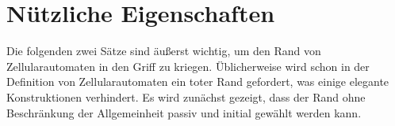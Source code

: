 \begin{comment}
    \begin{proposition}
        Sei $C$ ein $F$-haltender links-erkennender Zellularautomat und $n_0 \in \N$ so, dass $\cworsttime_C(n_0) < n_0$.
        Dann $\forall n \geq n_0: \cworsttime_C(n) = \cworsttime_C(n_0)$.
    \end{proposition}
    \begin{proof}
        Bei der Eingabe eines Wortes $w$ der Länge $n_0$ merkt $C$ nicht mehr, wenn $w$ verlängert wird.
        Ausführlicherer Beweis folgt.
    \end{proof}
\end{comment}

\section{Nützliche Eigenschaften}

Die folgenden zwei Sätze sind äußerst wichtig, um den Rand von Zellularautomaten in den Griff zu kriegen.
Üblicherweise wird schon in der Definition von Zellularautomaten ein toter Rand gefordert, was einige elegante Konstruktionen verhindert.
Es wird zunächst gezeigt, dass der Rand ohne Beschränkung der Allgemeinheit passiv und initial gewählt werden kann.

